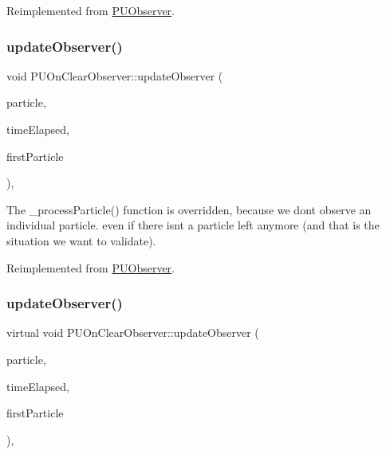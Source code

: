 Reimplemented from \hyperlink{classPUObserver}{P\+U\+Observer}.

\mbox{\label{classPUOnClearObserver_ab17df4b87cd37d6019e69a00e621a45f}} 
\subsubsection{\texorpdfstring{update\+Observer()}{updateObserver()}\hspace{0.1cm}{\footnotesize\ttfamily [1/2]}}
{\footnotesize\ttfamily void P\+U\+On\+Clear\+Observer\+::update\+Observer (\begin{DoxyParamCaption}\item[{\hyperlink{structPUParticle3D}{P\+U\+Particle3D} $\ast$}]{particle,  }\item[{float}]{time\+Elapsed,  }\item[{bool}]{first\+Particle }\end{DoxyParamCaption})\hspace{0.3cm}{\ttfamily [override]}, {\ttfamily [virtual]}}

The \+\_\+process\+Particle() function is overridden, because we don\textquotesingle{}t observe an individual particle. even if there isn\textquotesingle{}t a particle left anymore (and that is the situation we want to validate). 

Reimplemented from \hyperlink{classPUObserver}{P\+U\+Observer}.

\mbox{\label{classPUOnClearObserver_a6f369e4a21ee9a2f2ce546af9e971a43}} 
\subsubsection{\texorpdfstring{update\+Observer()}{updateObserver()}\hspace{0.1cm}{\footnotesize\ttfamily [2/2]}}
{\footnotesize\ttfamily virtual void P\+U\+On\+Clear\+Observer\+::update\+Observer (\begin{DoxyParamCaption}\item[{\hyperlink{structPUParticle3D}{P\+U\+Particle3D} $\ast$}]{particle,  }\item[{float}]{time\+Elapsed,  }\item[{bool}]{first\+Particle }\end{DoxyParamCaption})\hspace{0.3cm}{\ttfamily [override]}, {\ttfamily [virtual]}}

